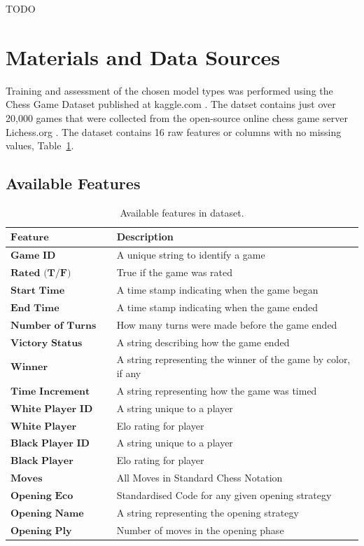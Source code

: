\documentclass[12pt]{article}
\begin{document}
TODO

\section{Materials and Data Sources}
\label{sec:dataset}

Training and assessment of the chosen model types was performed using the Chess Game Dataset published at kaggle.com \cite{chessDataset}. The datset contains just over 20,000 games that were collected from the open-source online chess game server Lichess.org \cite{lichessOrg}. The dataset contains 16 raw features or columns with no missing values, Table~\ref{tab:features}.

\subsection{Available Features}
\label{sec:features}

\begin{table}[h!]
\centering
\begin{tabular}{|l|l|}
\hline
$\textbf{Feature}$ & Description \\ \hline
$\textbf{Game ID}$ & A unique string to identify a game \\ \hline
$\textbf{Rated (T/F)}$ & True if the game was rated \\ \hline
$\textbf{Start Time}$ & A time stamp indicating when the game began \\ \hline
$\textbf{End Time}$ & A time stamp indicating when the game ended \\ \hline
$\textbf{Number of Turns}$ & How many turns were made before the game ended \\ \hline
$\textbf{Victory Status}$ & A string describing how the game ended \\ \hline
$\textbf{Winner}$ & A string representing the winner of the game by color, if any \\ \hline
$\textbf{Time Increment}$ & A string representing how the game was timed \\ \hline
$\textbf{White Player ID}$ & A string unique to a player \\ \hline
$\textbf{White Player Rating}$ & Elo rating for player \\ \hline
$\textbf{Black Player ID}$ & A string unique to a player \\ \hline
$\textbf{Black Player Rating}$ & Elo rating for player \\ \hline
$\textbf{Moves}$ & All Moves in Standard Chess Notation \\ \hline
$\textbf{Opening Eco}$ & Standardised Code for any given opening strategy \\ \hline
$\textbf{Opening Name}$ & A string representing the opening strategy \\ \hline
$\textbf{Opening Ply}$ & Number of moves in the opening phase \\ \hline
\end{tabular}
\caption{Available features in dataset.}
\label{tab:features}
\end{table}
\end{document}
